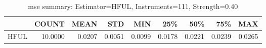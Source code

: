 \begin{table}[ht]
\centering
\caption{mse summary: Estimator=HFUL, Instruments=111, Strength=0.40}
\begin{tabular}{lrrrrrrrr}
\toprule
 & COUNT & MEAN & STD & MIN & 25\% & 50\% & 75\% & MAX \\
\midrule
HFUL & 10.0000 & 0.0207 & 0.0051 & 0.0099 & 0.0178 & 0.0221 & 0.0239 & 0.0265 \\
\bottomrule
\end{tabular}
\end{table}
